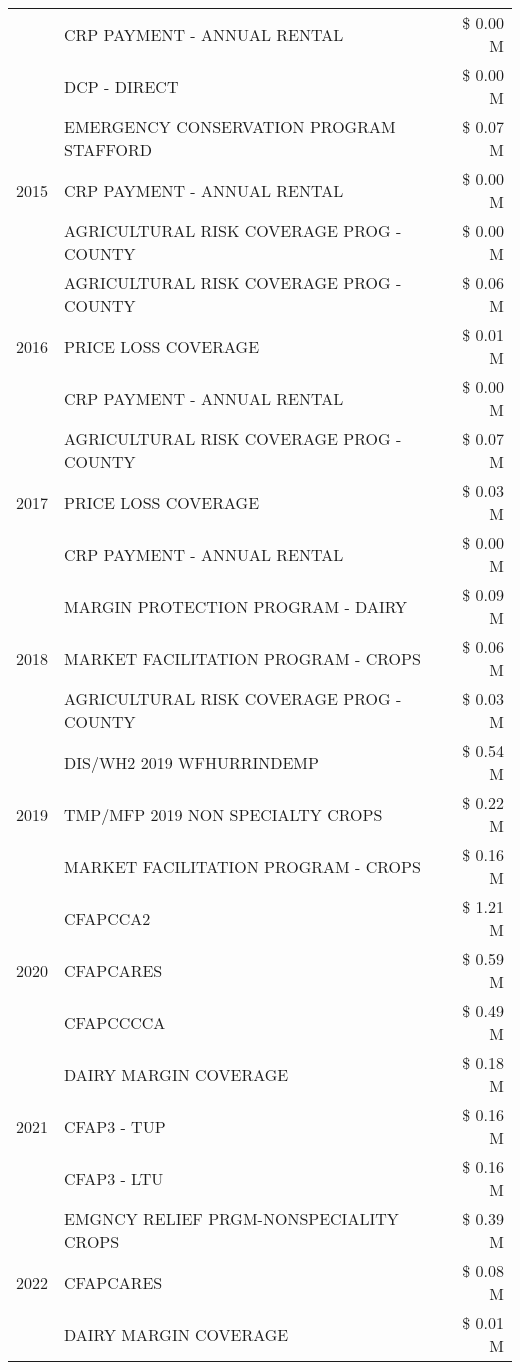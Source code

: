 \begin{tabular}{llr}
 & CRP PAYMENT - ANNUAL RENTAL & \$ 0.00 M \\
 & DCP - DIRECT & \$ 0.00 M \\
\cline{1-3}
\multirow[t]{3}{*}{2015} & EMERGENCY CONSERVATION PROGRAM STAFFORD & \$ 0.07 M \\
 & CRP PAYMENT - ANNUAL RENTAL & \$ 0.00 M \\
 & AGRICULTURAL RISK COVERAGE PROG - COUNTY & \$ 0.00 M \\
\cline{1-3}
\multirow[t]{3}{*}{2016} & AGRICULTURAL RISK COVERAGE PROG - COUNTY & \$ 0.06 M \\
 & PRICE LOSS COVERAGE & \$ 0.01 M \\
 & CRP PAYMENT - ANNUAL RENTAL & \$ 0.00 M \\
\cline{1-3}
\multirow[t]{3}{*}{2017} & AGRICULTURAL RISK COVERAGE PROG - COUNTY & \$ 0.07 M \\
 & PRICE LOSS COVERAGE & \$ 0.03 M \\
 & CRP PAYMENT - ANNUAL RENTAL & \$ 0.00 M \\
\cline{1-3}
\multirow[t]{3}{*}{2018} & MARGIN PROTECTION PROGRAM - DAIRY & \$ 0.09 M \\
 & MARKET FACILITATION PROGRAM - CROPS & \$ 0.06 M \\
 & AGRICULTURAL RISK COVERAGE PROG - COUNTY & \$ 0.03 M \\
\cline{1-3}
\multirow[t]{3}{*}{2019} & DIS/WH2 2019 WFHURRINDEMP & \$ 0.54 M \\
 & TMP/MFP 2019 NON SPECIALTY CROPS & \$ 0.22 M \\
 & MARKET FACILITATION PROGRAM - CROPS & \$ 0.16 M \\
\cline{1-3}
\multirow[t]{3}{*}{2020} & CFAPCCA2 & \$ 1.21 M \\
 & CFAPCARES & \$ 0.59 M \\
 & CFAPCCCCA & \$ 0.49 M \\
\cline{1-3}
\multirow[t]{3}{*}{2021} & DAIRY MARGIN COVERAGE & \$ 0.18 M \\
 & CFAP3 - TUP & \$ 0.16 M \\
 & CFAP3 - LTU & \$ 0.16 M \\
\cline{1-3}
\multirow[t]{3}{*}{2022} & EMGNCY RELIEF PRGM-NONSPECIALITY CROPS & \$ 0.39 M \\
 & CFAPCARES & \$ 0.08 M \\
 & DAIRY MARGIN COVERAGE & \$ 0.01 M \\
\cline{1-3}
\bottomrule
\end{tabular}
